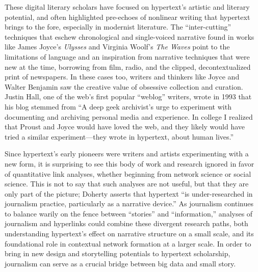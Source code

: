 These digital literary scholars have focused on hypertext's artistic and literary potential, and often highlighted pre-echoes of nonlinear writing that hypertext brings to the fore, especially in modernist literature. The ``inter-cutting'' techniques that eschew chronological and single-voiced narrative found in works like James Joyce's \emph{Ulysses} and Virginia Woolf's \emph{The Waves} point to the limitations of language and an inspiration from narrative techniques that were new at the time, borrowing from film, radio, and the clipped, decontextualized print of newspapers. In these cases too, writers and thinkers like Joyce and Walter Benjamin saw the creative value of obsessive collection and curation. Justin Hall, one of the web's first popular ``weblog'' writers, wrote in 1993 that his blog stemmed from ``A deep geek archivist's urge to experiment with documenting and archiving personal media and experience. In college I realized that Proust and Joyce would have loved the web, and they likely would have tried a similar experiment---they wrote in hypertext, about human lives.''\autocite{gillmor_we_2006}

Since hypertext's early pioneers were writers and artists experimenting with a new form, it is surprising to see this body of work and research ignored in favor of quantitative link analyses, whether beginning from network science or social science. This is not to say that such analyses are not useful, but that they are only part of the picture; Doherty asserts that hypertext ``is under-researched in journalism practice, particularly as a narrative device.''\autocite[124]{doherty_hypertext_2014} As journalism continues to balance warily on the fence between ``stories'' and ``information,'' analyses of journalism and hyperlinks could combine these divergent research paths, both understanding hypertext's effect on narrative structure on a small scale, and its foundational role in contextual network formation at a larger scale. In order to bring in new design and storytelling potentials to hypertext scholarship, journalism can serve as a crucial bridge between big data and small story.


